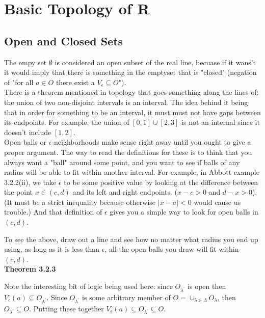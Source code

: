 \section{Basic Topology of R}

\subsection{Open and Closed Sets}

The empy set $\emptyset$ is considered an open subset of the real line, becuase if it wans't it would imply
that there is something in the emptyset that is "closed"
(negation of "for all $a\in O$ there exist a $V_\epsilon \subseteq O$").
\\

There is a theorem mentioned in topology that goes something along the lines of:
the union of two non-disjoint intervals is an interval.
The idea behind it being that in order for something to be an interval, it must must not have gaps
between its endpoints.
For example, the union of $[0,1] \cup [2,3]$ is not an internal since it doesn't include $[1,2]$.
\\

Open balls or $\epsilon$-neighborhoods make sense right away until you ought to give a proper argument.
The way to read the definitions for these is to think that you always want a "ball" around some
point, and you want to see if balls of any radius will be able to fit within another interval.
For example, in Abbott example 3.2.2(ii), we take $\epsilon$ to be some positive value by
looking at the difference between the point $x\in(c,d)$ and its left and right endpoints.
($x-c > 0$ and $d-x > 0$). (It must be a strict inequality because otherwise $|x-a| < 0$ would cause us trouble.)
And that definition of $\epsilon$ gives you a simple way to look for open balls in $(c,d)$.

To see the above, draw out a line and see how no matter what radius you end up using, as long as
it is less than $\epsilon$, all the open balls you draw will fit within $(c,d)$.
\\

\textbf{Theorem 3.2.3}

Note the interesting bit of logic being used here: since $O_{\lambda^\prime}$ is open then
$V_{\epsilon}(a) \subseteq O_{\lambda^\prime}$.
Since $O_{\lambda^\prime}$ is some arbitrary member of $O = \cup_{\lambda \in \Lambda} O_{\lambda}$,
then $O_{\lambda^\prime} \subseteq O$.
Putting these together $V_{\epsilon}(a) \subseteq O_{\lambda^\prime} \subseteq O$.
\\

